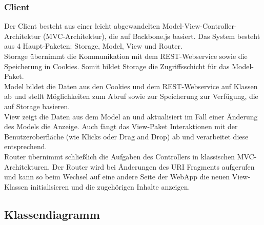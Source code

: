 \subsubsection{Client}
Der Client besteht aus einer leicht abgewandelten Model-View-Controller-Architektur (MVC-Architektur), die auf Backbone.js \cite{backbone} basiert.
Das System besteht aus 4 Haupt-Paketen: Storage, Model, View und Router.\\
Storage übernimmt die Kommunikation mit dem REST-Webservice sowie die Speicherung in Cookies. Somit bildet Storage die Zugriffsschicht für das Model-Paket. \\
Model bildet die Daten aus den Cookies und dem REST-Webservice auf Klassen ab und stellt Möglichkeiten zum Abruf sowie zur Speicherung zur Verfügung, die auf Storage basieren.\\
View zeigt die Daten aus dem Model an und aktualisiert im Fall einer Änderung des Models die Anzeige. Auch fängt das View-Paket Interaktionen mit der Benutzeroberfläche (wie Klicks oder Drag and Drop) ab und verarbeitet diese entsprechend.\\
Router übernimmt schließlich die Aufgaben des Controllers in klassischen MVC-Architekturen. Der Router wird bei Änderungen des URI Fragments aufgerufen und kann so beim Wechsel auf eine andere Seite der WebApp die neuen View-Klassen initialisieren und die zugehörigen Inhalte anzeigen.

\subsection{Klassendiagramm}  %